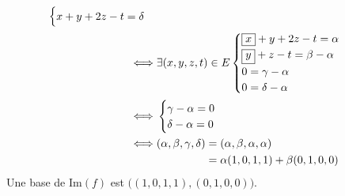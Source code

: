 \begin{enumerate}
\begin{align*}
\begin{cases}
				x + y + 2z - t = \delta\\
			\end{cases}\\
			\iff& \exists (x,y,z,t)\in E \begin{cases}
				\boxed x + y + 2z - t = \alpha\\
				\boxed y + z - t = \beta - \alpha\\
				0 = \gamma - \alpha\\
				0 = \delta - \alpha
			\end{cases}\\
			\iff& \begin{cases}
				\gamma - \alpha = 0\\
				\delta - \alpha = 0
			\end{cases}\\
			\iff& (\alpha, \beta, \gamma, \delta) = (\alpha, \beta, \alpha, \alpha)\\
			\phantom{\iff}& \phantom{(\alpha, \beta, \gamma, \delta)} = \alpha (1, 0, 1, 1) + \beta (0, 1, 0, 0)
		\end{align*}
		Une base de $\mathrm{Im}(f)$ est $\big((1,0,1,1),(0,1,0,0)\big)$.
\end{enumerate}

